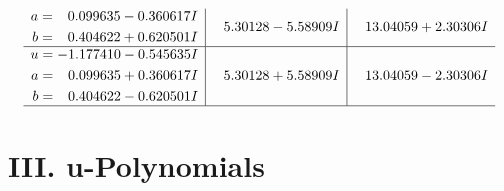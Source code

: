 \documentclass[1p]{elsarticle_modified}
\theoremstyle{definition}
\begin{document}
$$\begin{array}{c|c|c}
\begin{aligned}
a &= \phantom{-}0.099635 - 0.360617 I \\
b &= \phantom{-}0.404622 + 0.620501 I\end{aligned}
 & \phantom{-}5.30128 - 5.58909 I & \phantom{-}13.04059 + 2.30306 I \\ \hline\begin{aligned}
u &= -1.177410 - 0.545635 I \\
a &= \phantom{-}0.099635 + 0.360617 I \\
b &= \phantom{-}0.404622 - 0.620501 I\end{aligned}
 & \phantom{-}5.30128 + 5.58909 I & \phantom{-}13.04059 - 2.30306 I\\
 \hline 
 \end{array}$$\newpage
\newpage\renewcommand{\arraystretch}{1}
\centering \section*{ III. u-Polynomials}
\end{document}
